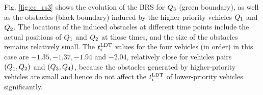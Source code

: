 Fig. \ref{fig:cc_rs3} shows the evolution of the BRS for $Q_3$ (green boundary), as well as the obstacles (black boundary) induced by the higher-priority vehicles $Q_1$ and $Q_2$. The locations of the induced obstacles at different time points include the actual positions of $Q_1$ and $Q_2$ at those times, and the size of the obstacles remains relatively small. The $t^\text{LDT}_i$ values for the four vehicles (in order) in this case are $-1.35, -1.37, -1.94$ and $-2.04$, relatively close for vehicles pairs $(Q_1, Q_2)$ and $(Q_3, Q_4)$, because the obstacles generated by higher-priority vehicles are small and hence do not affect the $t^\text{LDT}_i$ of lower-priority vehicles significantly.
